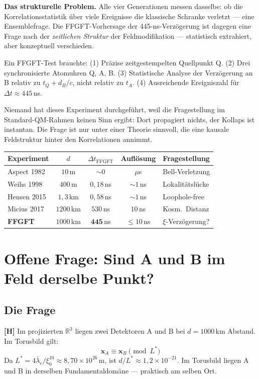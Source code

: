 \textbf{Das strukturelle Problem.}
Alle vier Generationen messen dasselbe: ob die Korrelationsstatistik über
viele Ereignisse die klassische Schranke verletzt --- eine Ensemblefrage.
Die FFGFT-Vorhersage der 445-ns-Verzögerung ist dagegen eine Frage nach der
\emph{zeitlichen Struktur} der Feldmodifikation --- statistisch extrahiert,
aber konzeptuell verschieden.

Ein FFGFT-Test brauchte: (1) Präzise zeitgestempelten Quellpunkt Q.
(2) Drei synchronisierte Atomuhren Q, A, B.
(3) Statistische Analyse der Verzögerung an B relativ zu $t_Q + d_B/c$,
nicht relativ zu $t_A$.
(4) Ausreichende Ereigniszahl für $\Delta t \approx 445$\,ns.

Niemand hat dieses Experiment durchgeführt, weil die Fragestellung im
Standard-QM-Rahmen keinen Sinn ergibt: Dort propagiert nichts, der Kollaps
ist instantan. Die Frage ist nur unter einer Theorie sinnvoll, die eine
kausale Feldstruktur hinter den Korrelationen annimmt.

\begin{center}
\small
\begin{tabular}{lcccp{2.8cm}}
\toprule
Experiment & $d$ & $\Delta t_\text{FFGFT}$ & Auflösung & Fragestellung \\
\midrule
Aspect 1982 & $10$\,m & $\sim 0$ & $\mu$s & Bell-Verletzung \\
Weihs 1998 & $400$\,m & $0{,}18$\,ns & $\sim 1$\,ns & Lokalitätslücke \\
Hensen 2015 & $1{,}3$\,km & $0{,}58$\,ns & $\sim 1$\,ns & Loophole-free \\
Micius 2017 & $1200$\,km & $530$\,ns & $10$\,ns & Kosm.\ Distanz \\
\textbf{FFGFT} & $1000$\,km & $\mathbf{445}$\,ns & $\le 10$\,ns & $\xi$-Verzögerung? \\
\bottomrule
\end{tabular}
\end{center}

\section{Offene Frage: Sind A und B im Feld derselbe Punkt?}
\label{sec:identischer_punkt}

\subsection{Die Frage}

\textbf{[H]} Im projizierten $\mathbb{R}^3$ liegen zwei Detektoren
A und B bei $d = 1000$\,km Abstand. Im Torusbild gilt:
\[
  \mathbf{x}_A \equiv \mathbf{x}_B \pmod{L^*}
\]
Da $L^* = 4\bar\lambda_e/\xi_0^{10} \approx 8{,}70 \times 10^{26}$\,m,
ist $d/L^* \approx 1{,}2\times10^{-21}$. Im Torusbild liegen A und B in derselben
Fundamentaldomäne --- praktisch am selben Ort.

